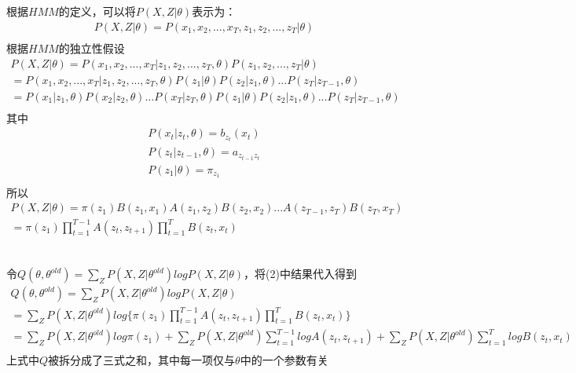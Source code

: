 \documentclass[12pt,a4paper]{article}
\begin{document}
\subsection{}
根据$HMM$的定义，可以将$P(X,Z|\theta)$表示为：
\begin{gather*}
    P(X,Z|\theta) = P(x_1,x_2,...,x_T,z_1,z_2,...,z_T|\theta)\\
\end{gather*}
根据$HMM$的独立性假设
\begin{gather*}
    P(X,Z|\theta) = P(x_1,x_2,...,x_T|z_1,z_2,...,z_T,\theta)P(z_1,z_2,...,z_T|\theta)\\
    =P(x_1,x_2,...,x_T|z_1,z_2,...,z_T,\theta)P(z_1|\theta)P(z_2|z_1,\theta)...P(z_T|z_{T-1},\theta)\\
    =P(x_1|z_1,\theta)P(x_2|z_2,\theta)...P(x_T|z_T,\theta)P(z_1|\theta)P(z_2|z_1,\theta)...P(z_T|z_{T-1},\theta)\\
\end{gather*}
其中
\begin{gather*}
    P(x_t|z_t,\theta) = b_{z_t}(x_t)\\
    P(z_t|z_{t-1},\theta) = a_{z_{t-1}z_t}\\
    P(z_1|\theta) = \pi_{z_1}\\
\end{gather*}
所以
\begin{gather*}
    P(X,Z|\theta) = \pi(z_1)B(z_1,x_1)A(z_1,z_2)B(z_2,x_2)...A(z_{T-1},z_T)B(z_T,x_T)\\
    =\pi(z_1)\prod_{t=1}^{T-1}A(z_t,z_{t+1})\prod_{t=1}^{T}B(z_t,x_t)\\
\end{gather*}
\subsection{}
令$Q(\theta, \theta^{old}) = \sum_{Z}P(X,Z|\theta^{old})logP(X,Z|\theta)$，将(2)中结果代入得到
\begin{gather*}
    Q(\theta, \theta^{old}) = \sum_{Z}P(X,Z|\theta^{old})logP(X,Z|\theta)\\
    =\sum_{Z}P(X,Z|\theta^{old})log\{\pi(z_1)\prod_{t=1}^{T-1}A(z_t,z_{t+1})\prod_{t=1}^{T}B(z_t,x_t)\}\\
    =\sum_{Z}P(X,Z|\theta^{old})log\pi(z_1)+\sum_{Z}P(X,Z|\theta^{old})\sum_{t=1}^{T-1}logA(z_t,z_{t+1})+\sum_{Z}P(X,Z|\theta^{old})\sum_{t=1}^{T}logB(z_t,x_t)\\
\end{gather*}
上式中$Q$被拆分成了三式之和，其中每一项仅与$\theta$中的一个参数有关
\end{document}
